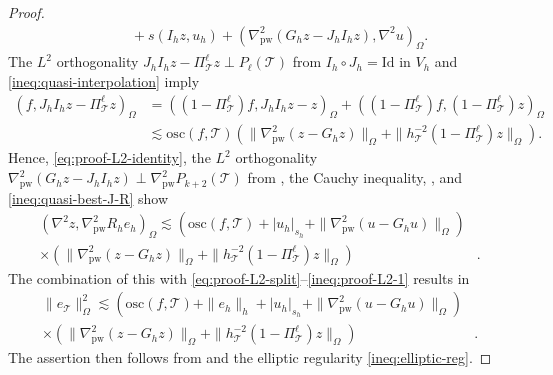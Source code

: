 \documentclass[10pt,a4paper]{amsart}
\def\T{\mathcal{T}}
\def\pw{\mathrm{pw}}
\begin{document}
\begin{proof}
\begin{align}
    	&\qquad + s(I_h z, u_h) + (\nabla_\pw^2(G_h z - J_h I_h z), \nabla^2 u)_\Omega.
    \end{align}
    The $L^2$ orthogonality $J_h I_h z - \Pi_\T^\ell z \perp P_{\ell}(\T)$ from $I_h \circ J_h = \mathrm{Id}$ in $V_h$ and \eqref{ineq:quasi-interpolation} imply
    \begin{align*}
    	(f, J_h I_h z - \Pi_\T^\ell z)_\Omega &= ((1 - \Pi_\T^\ell)f, J_h I_h z-z)_\Omega + ((1 - \Pi_\T^\ell)f, (1 - \Pi_\T^\ell) z)_\Omega\\
    	&\lesssim \mathrm{osc}(f,\T)(\|\nabla_\pw^2(z - G_h z)\|_\Omega + \|h_\T^{-2}(1-\Pi_\T^\ell)z\|_\Omega).
    \end{align*}
    Hence, \eqref{eq:proof-L2-identity}, the $L^2$ orthogonality $\nabla_\pw^2(G_h z - J_h I_h z) \perp \nabla_\pw^2 P_{k+2}(\T)$ from , the Cauchy inequality, , and \eqref{ineq:quasi-best-J-R} show
    \begin{align*}
    	(\nabla^2 z,\nabla^2_\pw R_h e_h)_{\Omega} \lesssim (\mathrm{osc}(f,\T) + |u_h|_{s_h} + \|\nabla_\pw^2(u - G_h u)\|_\Omega)&\\
        \times (\|\nabla_\pw^2(z - G_h z)\|_\Omega + \|h_\T^{-2}(1-\Pi_\T^\ell)z\|_\Omega)&.
    \end{align*}
    The combination of this with \eqref{eq:proof-L2-split}--\eqref{ineq:proof-L2-1} results in
    \begin{align*}
    	\|e_\T\|^2_\Omega \lesssim (\mathrm{osc}(f,\T) + \|e_h\|_h + |u_h|_{s_h} + \|\nabla_\pw^2(u - G_h u)\|_\Omega)&\\
        \times (\|\nabla_\pw^2(z - G_h z)\|_\Omega + \|h_\T^{-2}(1-\Pi_\T^\ell)z\|_\Omega)&.
    \end{align*}
    The assertion then follows from  and the elliptic regularity \eqref{ineq:elliptic-reg}.
\end{proof}
\end{document}
